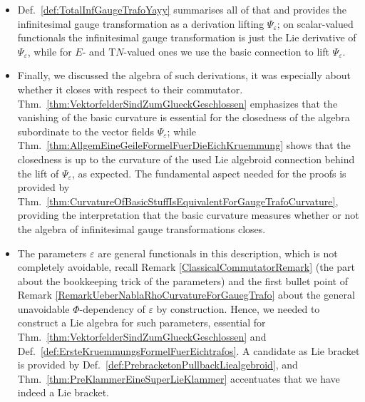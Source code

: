 \documentclass[CM,GP]{degruyter-crelle}       %
\theoremstyle{plain}
\theoremstyle{remark}
\theoremstyle{definition}
\begin{document}
\begin{itemize}
	\item Def.~\ref{def:TotalInfGaugeTrafoYayy} summarises all of that and provides the infinitesimal gauge transformation as a derivation lifting $\Psi_\varepsilon$; on scalar-valued functionals the infinitesimal gauge transformation is just the Lie derivative of $\Psi_\varepsilon$, while for $E$- and $\mathrm{T}N$-valued ones we use the basic connection to lift $\Psi_\varepsilon$.
	\item Finally, we discussed the algebra of such derivations, it was especially about whether it closes with respect to their commutator. Thm.~\ref{thm:VektorfelderSindZumGlueckGeschlossen} emphasizes that the vanishing of the basic curvature is essential for the closedness of the algebra subordinate to the vector fields $\Psi_\varepsilon$; while Thm.~\ref{thm:AllgemEineGeileFormelFuerDieEichKruemmung} shows that the closedness is up to the curvature of the used Lie algebroid connection behind the lift of $\Psi_\varepsilon$, as expected. The fundamental aspect needed for the proofs is provided by Thm.~\ref{thm:CurvatureOfBasicStuffIsEquivalentForGaugeTrafoCurvature}, providing the interpretation that the basic curvature measures whether or not the algebra of infinitesimal gauge transformations closes. 
	\item The parameters $\varepsilon$ are general functionals in this description, which is not completely avoidable, recall Remark \ref{ClassicalCommutatorRemark} (the part about the bookkeeping trick of the parameters) and the first bullet point of Remark \ref{RemarkUeberNablaRhoCurvatureForGauegTrafo} about the general unavoidable $\Phi$-dependency of $\varepsilon$ by construction. Hence, we needed to construct a Lie algebra for such parameters, essential for Thm.~\ref{thm:VektorfelderSindZumGlueckGeschlossen} and Def.~\ref{def:ErsteKruemmungsFormelFuerEichtrafos}. A candidate as Lie bracket is provided by Def.~\ref{def:PrebracketonPullbackLiealgebroid}, and Thm.~\ref{thm:PreKlammerEineSuperLieKlammer} accentuates that we have indeed a Lie bracket.
\end{itemize}



\end{document}
